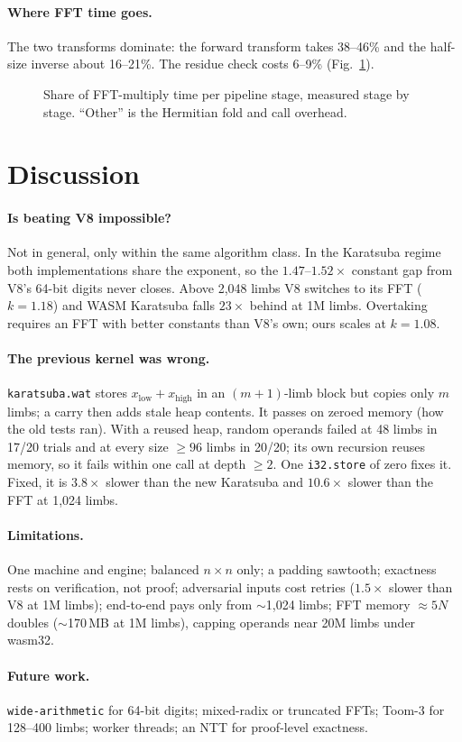 \documentclass[10pt,twocolumn]{article}
\begin{document}
\paragraph{Where FFT time goes.} The two transforms dominate: the forward transform takes
38--46\% and the half-size inverse about 16--21\%. The residue check costs 6--9\%
(Fig.~\ref{fig:profile}).

\begin{figure}[t]
\centering

\caption{Share of FFT-multiply time per pipeline stage, measured stage by stage.
``Other'' is the Hermitian fold and call overhead.}
\label{fig:profile}
\end{figure}

\section{Discussion}
\paragraph{Is beating V8 impossible?} Not in general, only within the same algorithm
class. In the Karatsuba regime both implementations share the exponent, so the
$1.47$--$1.52\times$ constant gap from V8's 64-bit digits never closes. Above 2,048 limbs
V8 switches to its FFT ($k=1.18$) and WASM Karatsuba falls $23\times$ behind at 1M
limbs. Overtaking requires an FFT with better constants than V8's own; ours scales at
$k=1.08$.

\paragraph{The previous kernel was wrong.} \texttt{karatsuba.wat} stores
$x_\text{low}+x_\text{high}$ in an $(m{+}1)$-limb block but copies only $m$ limbs; a
carry then adds stale heap contents. It passes on zeroed memory (how the old tests ran).
With a reused heap, random operands failed at 48 limbs in 17/20 trials and at every size
$\ge96$ limbs in 20/20; its own recursion reuses memory, so it fails within one call at
depth $\ge2$. One \texttt{i32.store} of zero fixes it. Fixed, it is $3.8\times$ slower
than the new Karatsuba and $10.6\times$ slower than the FFT at 1,024 limbs.

\paragraph{Limitations.} One machine and engine; balanced $n\times n$ only; a padding
sawtooth; exactness rests on verification, not proof; adversarial inputs cost retries
($1.5\times$ slower than V8 at 1M limbs); end-to-end pays only from $\sim$1,024 limbs;
FFT memory $\approx5N$ doubles ($\sim$170\,MB at 1M limbs), capping operands near 20M
limbs under wasm32.

\paragraph{Future work.} \texttt{wide-arithmetic} for 64-bit digits; mixed-radix or
truncated FFTs; Toom-3 for 128--400 limbs; worker threads; an NTT for proof-level
exactness.
\end{document}

